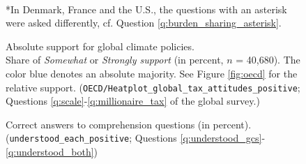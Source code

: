 \begin{figure}[h!]
    \cprotect\caption[Absolute support for global climate policies]{Absolute support for global climate policies. \\ Share of \textit{Somewhat} or \textit{Strongly support} (in percent, $n$ = 40,680). The color blue denotes an absolute majority. See Figure \ref{fig:oecd} for the relative support. (\verb|OECD/Heatplot_global_tax_attitudes_positive|; Questions \ref{q:scale}-\ref{q:millionaire_tax} of the global survey.)%
    } 
    \label{fig:oecd_absolute}%
    {\footnotesize \\ *In Denmark, France and the U.S., the questions with an asterisk were asked differently, cf. Question \ref{q:burden_sharing_asterisk}. } 
\end{figure}

\begin{figure}[h!]
    \cprotect\caption[Comprehension]{Correct answers to comprehension questions (in percent). (\verb|understood_each_positive|; Questions \ref{q:understood_gcs}-\ref{q:understood_both})}\label{fig:understood_each}
\end{figure}

